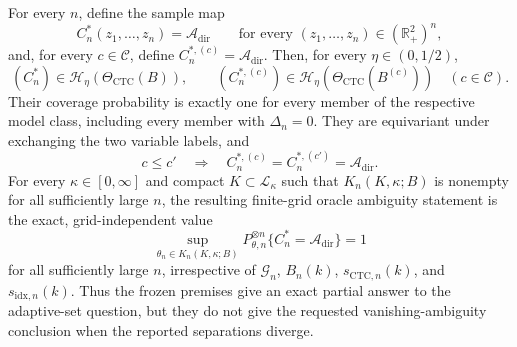 For every \(n\), define the sample map
\[
 C_n^*(z_1,\ldots,z_n)=\mathcal A_{\mathrm{dir}}
 \qquad\text{for every }(z_1,\ldots,z_n)\in(\mathbb R_+^2)^n,
\]
and, for every \(c\in\mathcal C\), define \(C_n^{*,(c)}=\mathcal A_{\mathrm{dir}}\).  Then, for every \(\eta\in(0,1/2)\),
\[
 (C_n^*)\in\mathcal H_\eta(\Theta_{\mathrm{CTC}}(B)),
 \qquad
 (C_n^{*,(c)})\in\mathcal H_\eta(\Theta_{\mathrm{CTC}}(B^{(c)}))
 \quad(c\in\mathcal C).
\]
Their coverage probability is exactly one for every member of the respective model class, including every member with \(\Delta_n=0\).  They are equivariant under exchanging the two variable labels, and
\[
 c\leq c'\quad\Longrightarrow\quad
 C_n^{*,(c)}=C_n^{*,(c')}=\mathcal A_{\mathrm{dir}}.
\]
For every \(\kappa\in[0,\infty]\) and compact \(K\subset\mathcal L_\kappa\) such that \(K_n(K,\kappa;B)\) is nonempty for all sufficiently large \(n\), the resulting finite-grid oracle ambiguity statement is the exact, grid-independent value
\[
 \sup_{\theta_n\in K_n(K,\kappa;B)}
 P_{\theta,n}^{\otimes n}\{C_n^*=\mathcal A_{\mathrm{dir}}\}=1
\]
for all sufficiently large \(n\), irrespective of \(\mathcal G_n\), \(B_n(k)\), \(s_{\mathrm{CTC},n}(k)\), and \(s_{\mathrm{idx},n}(k)\).  Thus the frozen premises give an exact partial answer to the adaptive-set question, but they do not give the requested vanishing-ambiguity conclusion when the reported separations diverge.